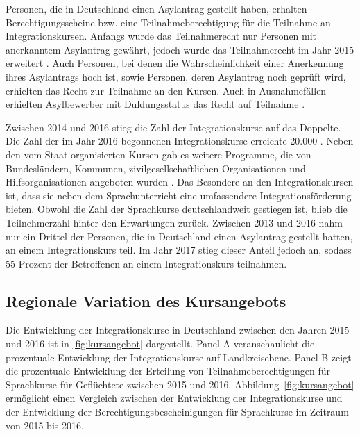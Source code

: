 Personen, die in Deutschland einen Asylantrag gestellt haben, erhalten Berechtigungsscheine bzw. eine Teilnahmeberechtigung für die Teilnahme an Integrationskursen. Anfangs wurde das Teilnahmerecht nur Personen mit anerkanntem Asylantrag gewährt, jedoch wurde das Teilnahmerecht im Jahr 2015 erweitert \parencite{kosyakova2020role}. Auch Personen, bei denen die Wahrscheinlichkeit einer Anerkennung ihres Asylantrags hoch ist, sowie Personen, deren Asylantrag noch geprüft wird, erhielten das Recht zur Teilnahme an den Kursen. Auch in Ausnahmefällen erhielten Asylbewerber mit Duldungsstatus das Recht auf Teilnahme \parencite{kosyakova2020role}.

Zwischen 2014 und 2016 stieg die Zahl der Integrationskurse auf das Doppelte. Die Zahl der im Jahr 2016 begonnenen Integrationskurse erreichte 20.000 \parencite{grote2018changing}. Neben den vom Staat organisierten Kursen gab es weitere Programme, die von Bundesländern, Kommunen, zivilgesellschaftlichen Organisationen und Hilfsorganisationen angeboten wurden \parencites{kosyakova2020role}{brucker2020has}. Das Besondere an den Integrationskursen ist, dass sie neben dem Sprachunterricht eine umfassendere Integrationsförderung bieten. Obwohl die Zahl der Sprachkurse deutschlandweit gestiegen ist, blieb die Teilnehmerzahl hinter den Erwartungen zurück. Zwischen 2013 und 2016 nahm nur ein Drittel der Personen, die in Deutschland einen Asylantrag gestellt hatten, an einem Integrationskurs teil. Im Jahr 2017 stieg dieser Anteil jedoch an, sodass 55 Prozent der Betroffenen an einem Integrationskurs teilnahmen.


\subsection{Regionale Variation des Kursangebots}
\label{sec:erg-angebot}

Die Entwicklung der Integrationskurse in Deutschland zwischen den Jahren 2015 und 2016 ist in \ref{fig:kursangebot}  dargestellt. Panel A veranschaulicht die prozentuale Entwicklung der Integrationskurse auf Landkreisebene. Panel B zeigt die prozentuale Entwicklung der Erteilung von Teilnahmeberechtigungen für Sprachkurse für Geflüchtete zwischen 2015 und 2016. Abbildung~\ref{fig:kursangebot} ermöglicht einen Vergleich zwischen der Entwicklung der Integrationskurse und der Entwicklung der Berechtigungsbescheinigungen für Sprachkurse im Zeitraum von 2015 bis 2016.


